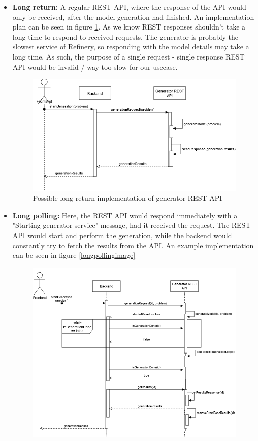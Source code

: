 \begin{itemize}
        \item \textbf{Long return:}
		A regular REST API, where the response of the API would only be received, after
		the model generation had finished. An implementation plan can be seen in figure \ref{longreturnimage}. 
		As we know REST responses shouldn't take a long time to respond to received requests.
		The generator is probably the slowest service of Refinery, so responding with the model details may take a long time.
		As such, the purpose of a single request - single response REST API would be invalid / way too slow for our usecase.
		\begin{figure}
			\begin{center}
				\includegraphics[scale=0.6]{include/imgs/rest_long_return.png}
				\caption{Possible long return implementation of generator REST API}
				\label{longreturnimage}
			\end{center}
		\end{figure}
		\item \textbf{Long polling:}
		Here, the REST API would respond immediately with a "Starting generator service" message, had it received the request.
		The REST API would start and perform the generation, while the backend would constantly try to fetch the results from the API.
		An example implementation can be seen in figure \ref{longpollingimage}
		\begin{figure}
			\begin{center}
				\includegraphics[scale=0.5]{include/imgs/rest_long_poll.png}

\end{center}
\end{figure}
\end{itemize}
